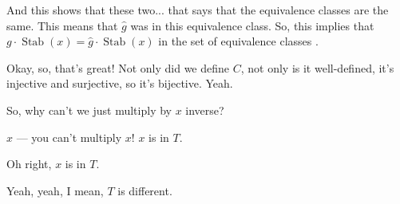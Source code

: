 \begin{proofWrapper}
\begin{speech}[00:31:07 - 00:32:51]
And this shows that these two... that says that the equivalence classes are the same. This means that $\hat{g}$ was in this equivalence class. So, this implies that $g \cdot \operatorname{Stab}(x) = \hat{g} \cdot \operatorname{Stab}(x)$ in the set of equivalence classes .

Okay, so, that's great! Not only did we define $C$, not only is it well-defined, it's injective and surjective, so it's bijective. Yeah.
\end{speech}

\begin{student}
So, why can't we just multiply by $x$ inverse?
\end{student}

\begin{speech}[00:32:54 - 00:32:58]
$x$ --- you can't multiply $x$! $x$ is in $T$.
\end{speech}

\begin{student}
Oh right, $x$ is in $T$.
\end{student}

\begin{speech}[00:33:00 - 00:33:05]
Yeah, yeah, I mean, $T$ is different.
\end{speech}

\begin{content}


\end{content}
\end{proofWrapper}
